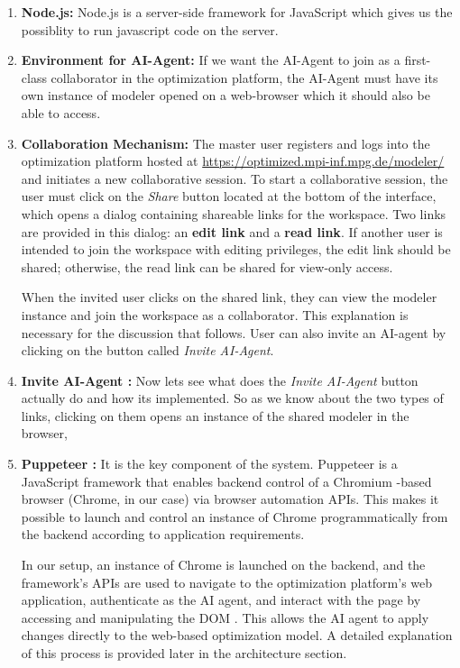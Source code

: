 \begin{enumerate}
    \item \textbf{Node.js: } Node.js is a server-side framework for JavaScript which gives us the possiblity to run javascript code on the server. 
    \item \textbf{Environment for AI-Agent: } If we want the AI-Agent to join as a first-class collaborator in the optimization platform, the AI-Agent must have its own instance of modeler opened on a web-browser which it should also be able to access. 
    \item \textbf{Collaboration Mechanism: } The master user \cite{MarkoThesisMsc} registers and logs into the optimization platform hosted at \url{https://optimized.mpi-inf.mpg.de/modeler/} and initiates a new collaborative session. To start a collaborative session, the user must click on the \emph{Share} button located at the bottom of the interface, which opens a dialog containing shareable links for the workspace. Two links are provided in this dialog: an \textbf{edit link} and a \textbf{read link}. If another user is intended to join the workspace with editing privileges, the edit link should be shared; otherwise, the read link can be shared for view-only access. 

When the invited user clicks on the shared link, they can view the modeler instance and join the workspace as a collaborator. This explanation is necessary for the discussion that follows. User can also invite an AI-agent by clicking on the button called \emph{Invite AI-Agent}.

    \item \textbf{Invite AI-Agent : } Now lets see what does the \emph{Invite AI-Agent} button actually do and how its implemented. So as we know about the two types of links, clicking on them opens an instance of the shared modeler in the browser, 

    \item \textbf{Puppeteer : } It is the key component of the system. Puppeteer \cite{pptrPuppeteerPuppeteer} is a JavaScript framework that enables backend control of a Chromium \cite{chromiumHome}-based browser (Chrome, in our case) via browser automation APIs. This makes it possible to launch and control an instance of Chrome programmatically from the backend according to application requirements. 
    
    In our setup, an instance of Chrome is launched on the backend, and the framework’s APIs are used to navigate to the optimization platform’s web application, authenticate as the AI agent, and interact with the page by accessing and manipulating the DOM \cite{mozillaDocumentObject}. This allows the AI agent to apply changes directly to the web-based optimization model. A detailed explanation of this process is provided later in the architecture section.


\end{enumerate}
